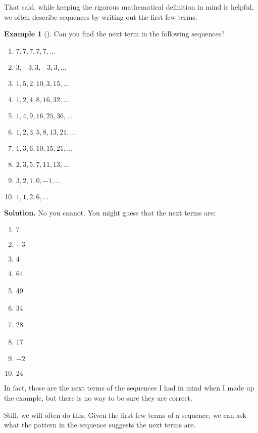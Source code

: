 \documentclass[12pt,]{book}
\theoremstyle{plain}
\theoremstyle{definition}
\theoremstyle{definition}
\newtheorem{example}[theorem]{Example}
\theoremstyle{definition}
\numberwithin{equation}{chapter}
\begin{document}
\par
\hypertarget{p-26}{}%
That said, while keeping the rigorous mathematical definition in mind is helpful, we often describe sequences by writing out the first few terms.%
\begin{example}[]\label{example-1}
\hypertarget{p-27}{}%
Can you find the next term in the following sequences?%
\par
\hypertarget{p-28}{}%
\leavevmode%
\begin{enumerate}
\item\hypertarget{li-4}{}\(7,7,7,7,7, \ldots\)%
\item\hypertarget{li-5}{}\(3, -3, 3, -3, 3, \ldots\)%
\item\hypertarget{li-6}{}\(1, 5, 2, 10, 3, 15, \ldots\)%
\item\hypertarget{li-7}{}\(1, 2, 4, 8, 16, 32, \ldots\)%
\item\hypertarget{li-8}{}\(1, 4, 9, 16, 25, 36, \ldots\)%
\item\hypertarget{li-9}{}\(1, 2, 3, 5, 8, 13, 21, \ldots\)%
\item\hypertarget{li-10}{}\(1, 3, 6, 10, 15, 21, \ldots\)%
\item\hypertarget{li-11}{}\(2, 3, 5, 7, 11, 13, \ldots\)%
\item\hypertarget{li-12}{}\(3, 2, 1, 0, -1, \ldots\)%
\item\hypertarget{li-13}{}\(1, 1, 2, 6, \ldots\)%
\end{enumerate}
%
\par\smallskip%
\noindent\textbf{Solution.}\hypertarget{solution-1}{}\quad%
\hypertarget{p-29}{}%
No you cannot. You might guess that the next terms are:%
\par
\hypertarget{p-30}{}%
\leavevmode%
\begin{enumerate}
\item\hypertarget{li-14}{}\(7\)%
\item\hypertarget{li-15}{}\(-3\)%
\item\hypertarget{li-16}{}\(4\)%
\item\hypertarget{li-17}{}\hypertarget{p-31}{}%
64%
\item\hypertarget{li-18}{}\hypertarget{p-32}{}%
49%
\item\hypertarget{li-19}{}\hypertarget{p-33}{}%
34%
\item\hypertarget{li-20}{}\hypertarget{p-34}{}%
28%
\item\hypertarget{li-21}{}\hypertarget{p-35}{}%
17%
\item\hypertarget{li-22}{}\(-2\)%
\item\hypertarget{li-23}{}\(24\)%
\end{enumerate}
%
\par
\hypertarget{p-36}{}%
In fact, those are the next terms of the sequences I had in mind when I made up the example, but there is no way to be sure they are correct.%
\par
\hypertarget{p-37}{}%
Still, we will often do this. Given the first few terms of a sequence, we can ask what the pattern in the sequence suggests the next terms are.%
\end{example}
\end{document}
